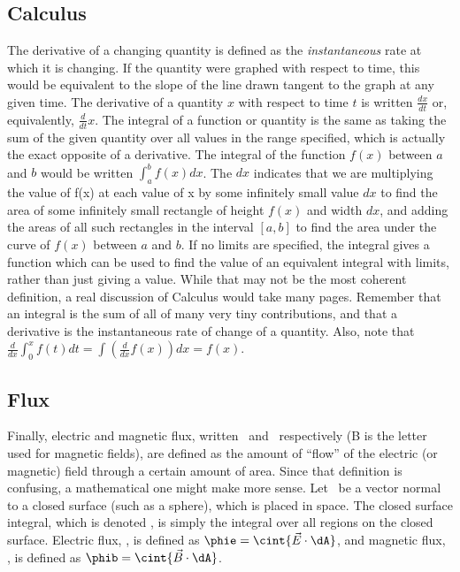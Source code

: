 \documentclass[12pt]{article}
\begin{document}
\subsection{Calculus}

\indent The derivative of a changing quantity is defined as the \textit{instantaneous} rate at which it is changing. If the quantity were graphed with respect to time, this would be equivalent to the slope of the line drawn tangent to the graph at any given time. The derivative of a quantity $x$ with respect to time $t$ is written $\displaystyle \frac{dx}{dt}$ or, equivalently, $\displaystyle \frac{d}{dt} x$. The integral of a function or quantity is the same as taking the sum of the given quantity over all values in the range specified, which is actually the exact opposite of a derivative. The integral of the function $f(x)$ between $a$ and $b$ would be written $\displaystyle\int_a^b{f(x)dx}$. The $dx$ indicates that we are multiplying the value of f(x) at each value of x by some infinitely small value $dx$ to find the area of some infinitely small rectangle of height $f(x)$ and width $dx$, and adding the areas of all such rectangles in the interval $[a,b]$ to find the area under the curve of $f(x)$ between $a$ and $b$. If no limits are specified, the integral gives a function which can be used to find the value of an equivalent integral with limits, rather than just giving a value. While that may not be the most coherent definition, a real discussion of Calculus would take many pages. Remember that an integral is the sum of all of many very tiny contributions, and that a derivative is the instantaneous rate of change of a quantity. Also, note that $\displaystyle \frac{d}{dx} \int_0^x{f(t)dt}=\int{\left(\frac{d}{dx}f(x)\right)dx}=f(x)$.

\subsection{Flux}

\indent Finally, electric and magnetic flux, written \phie \ and \phib \ respectively (B is the letter used for magnetic fields), are defined as the amount of ``flow'' of the electric (or magnetic) field through a certain amount of area. Since that definition is confusing, a mathematical one might make more sense. Let \dA \ be a vector normal to a closed surface (such as a sphere), which is placed in space. The closed surface integral, which is denoted \cint{}, is simply the integral over all regions on the closed surface. Electric flux, \phie, is defined as $\phie=\cint{\vec{E}\cdot \dA}$, and magnetic flux, \phib, is defined as $\phib=\cint{\vec{B}\cdot \dA}$.
\end{document}
